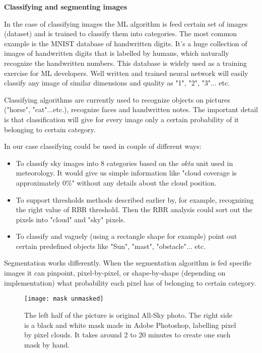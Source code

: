 \documentclass[]{book}
\begin{document}
		\textbf{Classifying and segmenting images}
		
		In the case of classifying images the ML algorithm is feed certain set of images (dataset) and is trained to classify them into categories. The most common example is the MNIST database of handwritten digits. It's a huge collection of images of handwritten digits that is labelled by humans, which naturally recognize the handwritten numbers. This database is widely used as a training exercise for ML developers. Well written and trained neural network will easily classify any image of similar dimensions and quality as "1", "2", "3"... etc.
		
		Classifying algorithms are currently used to recognize objects on pictures ("horse", "cat"...etc.), recognize faces and handwritten notes. The important detail is that classification will give for every image only a certain probability of it belonging to certain category.
		
		In our case classifying could be used in couple of different ways:
		
		\begin{itemize}
			\item To classify sky images into 8 categories based on the \textit{okta} unit used in meteorology. It would give us simple information like "cloud coverage is approximately $0 \%$" without any details about the cloud position.
			\item To support thresholds methods described earlier by, for example, recognizing the right value of RBR threshold. Then the RBR analysis could sort out the pixels into "cloud" and "sky" pixels.
			\item To classify and vaguely (using a rectangle shape for example) point out certain predefined objects like "Sun", "mast", "obstacle"... etc.
		\end{itemize}
	
		Segmentation works differently. When the segmentation algorithm is fed specific images it can pinpoint, pixel-by-pixel, or shape-by-shape (depending on implementation) what probability each pixel has of belonging to certain category.
		
		\begin{figure} [h]
			\centering
			\texttt{[image: mask unmasked]}
			\caption{The left half of the picture is original All-Sky photo. The right side is a black and white mask made in Adobe Photoshop, labelling pixel by pixel clouds. It takes around 2 to 20 minutes to create one such mask by hand.}
			\label{fig: mask unmasked}
		\end{figure}
		
\end{document}
